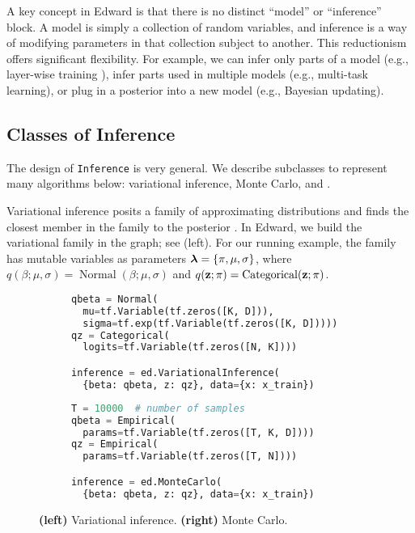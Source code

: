 A key concept in Edward is that there is no distinct ``model''
or ``inference'' block. A model is simply a collection of random
variables, and inference is a way of modifying parameters in that
collection subject to another. This reductionism offers
significant flexibility. For example, we can
infer only parts of a model (e.g.,
layer-wise training \citep{hinton2006fast}),
infer parts used in multiple models
(e.g., multi-task learning), or
plug in a posterior into a new model
(e.g., Bayesian updating).

\subsection{Classes of Inference}

The design of \texttt{Inference} is very general.  We describe
subclasses to represent many algorithms below: variational inference,
Monte Carlo, and .

Variational inference posits a family of approximating distributions
and finds the closest member in the family to the posterior
\citep{jordan1999introduction}.  In Edward, we build the variational
family in the graph; see  (left). For our running
example, the
family has mutable variables as parameters
$\boldsymbol{\mathbf{\lambda}}=\{\pi,\mu,\sigma\}$, where
$q(\beta;\mu,\sigma) = \operatorname{Normal}(\beta; \mu,\sigma)$ and
$q(\boldsymbol{\mathbf{z}};\pi) = \operatorname{Categorical}(\boldsymbol{\mathbf{z}};\pi)$.

\begin{figure}[!h]
\begin{subfigure}{0.5\columnwidth}
  \centering
\begin{lstlisting}[language=Python]
qbeta = Normal(
  mu=tf.Variable(tf.zeros([K, D])),
  sigma=tf.exp(tf.Variable(tf.zeros([K, D]))))
qz = Categorical(
  logits=tf.Variable(tf.zeros([N, K])))

inference = ed.VariationalInference(
  {beta: qbeta, z: qz}, data={x: x_train})
\end{lstlisting}
\end{subfigure}%
\begin{subfigure}{0.5\columnwidth}
  \centering
\begin{lstlisting}[language=Python]
T = 10000  # number of samples
qbeta = Empirical(
  params=tf.Variable(tf.zeros([T, K, D])))
qz = Empirical(
  params=tf.Variable(tf.zeros([T, N])))

inference = ed.MonteCarlo(
  {beta: qbeta, z: qz}, data={x: x_train})
\end{lstlisting}
\end{subfigure}
\caption{\textbf{(left)} Variational inference. \textbf{(right)} Monte Carlo.}
\label{fig:inference}
\end{figure}

